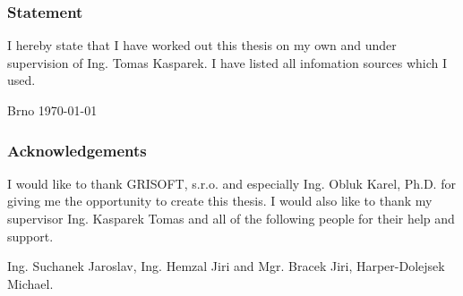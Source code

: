\begin{titlepage}
	\subsubsection{Statement}
	I hereby state that I have worked out this thesis on my own and under
	supervision of Ing. Tomas Kasparek. I have listed all infomation
	sources which I used.

	\vspace{3cm}
	\noindent \parbox[t]{12cm}{\noindent Brno {\today} \hfill \dotfill \\}
	\vspace{4cm}

	\subsubsection{Acknowledgements}
	I would like to thank GRISOFT, s.r.o. and especially Ing. Obluk Karel, Ph.D.
	for giving me the opportunity to create this thesis. I would also like to
	thank my supervisor Ing. Kasparek Tomas and all of the following people for
	their help and support.

	\noindent Ing. Suchanek Jaroslav, Ing. Hemzal Jiri and Mgr. Bracek Jiri,
	Harper-Dolejsek Michael.
\end{titlepage}

